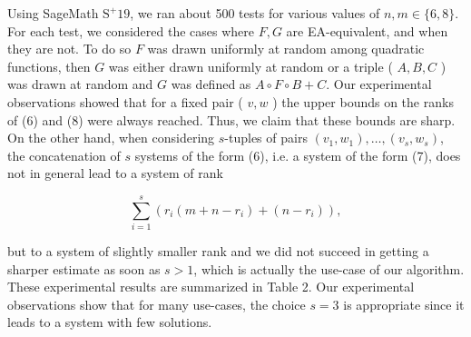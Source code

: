 \documentclass[10pt]{article}
\begin{document}
Using SageMath $\mathrm{S}^{+} 19$, we ran about 500 tests for various values of $n, m \in\{6,8\}$. For each test, we considered the cases where $F, G$ are EA-equivalent, and when they are not. To do so $F$ was drawn uniformly at random among quadratic functions, then $G$ was either drawn uniformly at random or a triple ( $A, B, C$ ) was drawn at random and $G$ was defined as $A \circ F \circ B+C$. Our experimental observations showed that for a fixed pair ( $v, w$ ) the upper bounds on the ranks of (6) and (8) were always reached. Thus, we claim that these bounds are sharp. On the other hand, when considering $s$-tuples of pairs $\left(v_{1}, w_{1}\right), \ldots,\left(v_{s}, w_{s}\right)$, the concatenation of $s$ systems of the form (6), i.e. a system of the form (7), does not in general lead to a system of rank


\begin{equation*}
\sum_{i=1}^{s}\left(r_{i}\left(m+n-r_{i}\right)+\left(n-r_{i}\right)\right), \tag{10}
\end{equation*}


but to a system of slightly smaller rank and we did not succeed in getting a sharper estimate as soon as $s>1$, which is actually the use-case of our algorithm. These experimental results are summarized in Table 2. Our experimental observations show that for many use-cases, the choice $s=3$ is appropriate since it leads to a system with few solutions.
\end{document}
